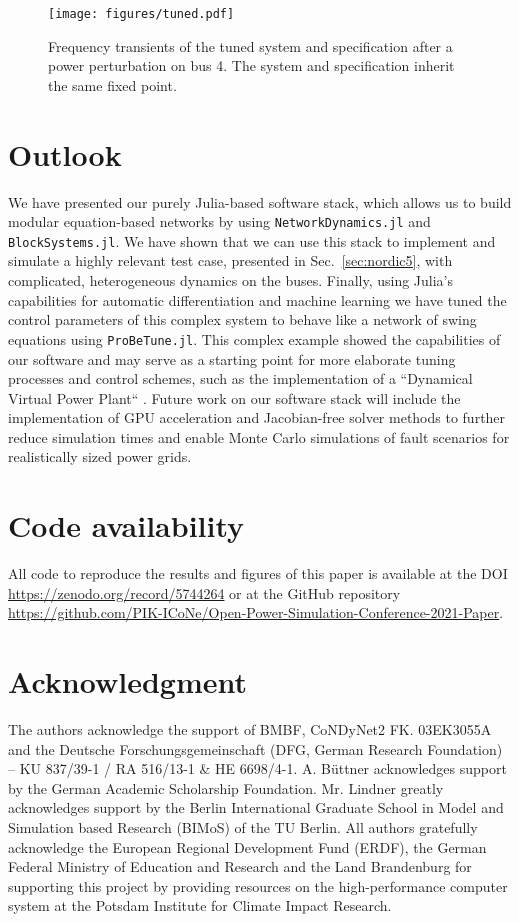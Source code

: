 \documentclass[conference]{IEEEtran}
\begin{document}
\begin{figure}%
    \centering
    \texttt{[image: figures/tuned.pdf]}
    \caption{Frequency transients of the tuned system and specification after a power perturbation on bus 4. The system and specification inherit the same fixed point. \label{fig:tuned}}
\end{figure}
\section{Outlook}
We have presented our purely Julia-based software stack, which allows us to build modular equation-based networks by using \texttt{NetworkDynamics.jl} and \texttt{BlockSystems.jl}. We have shown that we can use this stack to implement and simulate a highly relevant test case, presented in Sec.~\ref{sec:nordic5}, with complicated, heterogeneous dynamics on the buses. Finally, using Julia's capabilities for automatic differentiation and machine learning we have tuned the control parameters of this complex system to behave like a network of swing equations using \texttt{ProBeTune.jl}. This complex example showed the capabilities of our software and may serve as a starting point for more elaborate tuning processes and control schemes, such as the implementation of a “Dynamical Virtual Power Plant“ \cite{dvpp}. Future work on our software stack will include the implementation of GPU acceleration and Jacobian-free solver methods to further reduce simulation times and enable Monte Carlo simulations of fault scenarios for realistically sized power grids. 



\section*{Code availability}

All code to reproduce the results and figures of this paper is available at the DOI \url{https://zenodo.org/record/5744264} or at the GitHub repository \url{https://github.com/PIK-ICoNe/Open-Power-Simulation-Conference-2021-Paper}.

\section*{Acknowledgment}

The authors acknowledge the support of BMBF, CoNDyNet2 FK. 03EK3055A and the Deutsche Forschungsgemeinschaft (DFG, German Research Foundation) – KU 837/39-1 / RA 516/13-1 \& HE 6698/4-1.
A. Büttner acknowledges support by the German Academic Scholarship Foundation.
Mr. Lindner greatly acknowledges support by the Berlin International Graduate School in Model and Simulation based Research (BIMoS) of the TU Berlin.
All authors gratefully acknowledge the European Regional Development Fund (ERDF), the German Federal Ministry of Education and Research and the Land Brandenburg for supporting this project by providing resources on the high-performance computer system at the Potsdam Institute for Climate Impact Research.



\end{document}
